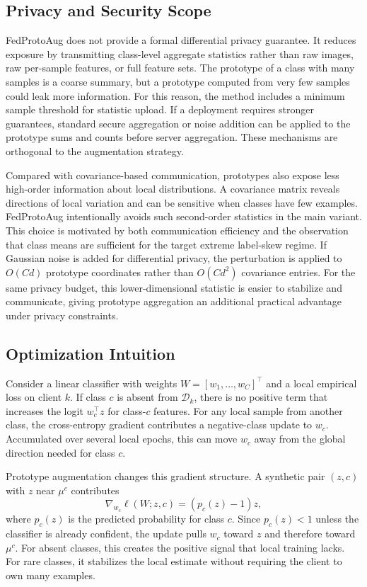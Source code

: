 ﻿\documentclass[conference]{IEEEtran}
\newcommand{\method}{FedProtoAug}
\begin{document}
\subsection{Privacy and Security Scope}
\method{} does not provide a formal differential privacy guarantee. It reduces exposure by transmitting class-level aggregate statistics rather than raw images, raw per-sample features, or full feature sets. The prototype of a class with many samples is a coarse summary, but a prototype computed from very few samples could leak more information. For this reason, the method includes a minimum sample threshold for statistic upload. If a deployment requires stronger guarantees, standard secure aggregation or noise addition can be applied to the prototype sums and counts before server aggregation. These mechanisms are orthogonal to the augmentation strategy.

Compared with covariance-based communication, prototypes also expose less high-order information about local distributions. A covariance matrix reveals directions of local variation and can be sensitive when classes have few examples. \method{} intentionally avoids such second-order statistics in the main variant. This choice is motivated by both communication efficiency and the observation that class means are sufficient for the target extreme label-skew regime.
If Gaussian noise is added for differential privacy, the perturbation is applied to $O(Cd)$ prototype coordinates rather than $O(Cd^2)$ covariance entries. For the same privacy budget, this lower-dimensional statistic is easier to stabilize and communicate, giving prototype aggregation an additional practical advantage under privacy constraints.

\subsection{Optimization Intuition}
Consider a linear classifier with weights $W=[w_1,\ldots,w_C]^\top$ and a local empirical loss on client $k$. If class $c$ is absent from $\mathcal{D}_k$, there is no positive term that increases the logit $w_c^\top z$ for class-$c$ features. For any local sample from another class, the cross-entropy gradient contributes a negative-class update to $w_c$. Accumulated over several local epochs, this can move $w_c$ away from the global direction needed for class $c$.

Prototype augmentation changes this gradient structure. A synthetic pair $(z,c)$ with $z$ near $\mu^c$ contributes
\begin{equation}
\nabla_{w_c}\ell(W;z,c) = (p_c(z)-1)z,
\end{equation}
where $p_c(z)$ is the predicted probability for class $c$. Since $p_c(z)<1$ unless the classifier is already confident, the update pulls $w_c$ toward $z$ and therefore toward $\mu^c$. For absent classes, this creates the positive signal that local training lacks. For rare classes, it stabilizes the local estimate without requiring the client to own many examples.
\end{document}
